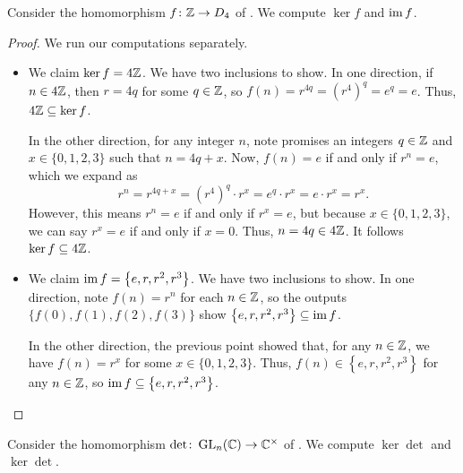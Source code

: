 \documentclass[../main.tex]{subfiles}
\begin{document}
\begin{example} \label{ex:z-to-d4-ker-im}
    Consider the homomorphism $f\colon\mathbb Z\to D_4$ of . We compute $\ker f$ and $\operatorname{im} f$.
\end{example}
\begin{proof}
    We run our computations separately.
    \begin{itemize}
        \item We claim $\ker f=4\mathbb Z$. We have two inclusions to show. In one direction, if $n\in4\mathbb Z$, then $r=4q$ for some $q\in\mathbb Z$, so $f(n)=r^{4q}=\left(r^4\right)^q=e^q=e$. Thus, $4\mathbb Z\subseteq\ker f$.
        
        In the other direction, for any integer $n$, note  promises an integers $q\in\mathbb Z$ and $x\in\{0,1,2,3\}$ such that $n=4q+x$. Now, $f(n)=e$ if and only if $r^n=e$, which we expand as
        \[r^n=r^{4q+x}=\left(r^4\right)^q\cdot r^x=e^q\cdot r^x=e\cdot r^x=r^x.\]
        However, this means $r^n=e$ if and only if $r^x=e$, but because $x\in\{0,1,2,3\}$, we can say $r^x=e$ if and only if $x=0$. Thus, $n=4q\in4\mathbb Z$. It follows $\ker f\subseteq4\mathbb Z$.
        
        \item We claim $\operatorname{im} f=\left\{e,r,r^2,r^3\right\}$. We have two inclusions to show. In one direction, note $f(n)=r^n$ for each $n\in\mathbb Z$, so the outputs $\{f(0),f(1),f(2),f(3)\}$ show $\left\{e,r,r^2,r^3\right\}\subseteq\operatorname{im} f$.
        
        In the other direction, the previous point showed that, for any $n\in\mathbb Z$, we have $f(n)=r^x$ for some $x\in\{0,1,2,3\}$. Thus, $f(n)\in\left\{e,r,r^2,r^3\right\}$ for any $n\in\mathbb Z$, so $\operatorname{im} f\subseteq\left\{e,r,r^2,r^3\right\}$.
        \qedhere
    \end{itemize}
\end{proof}
\begin{example}
    Consider the homomorphism $\det\colon\operatorname{GL}_n(\mathbb C)\to\mathbb C^\times$ of . We compute $\ker\det$ and $\ker\det$.
\end{example}
\end{document}
